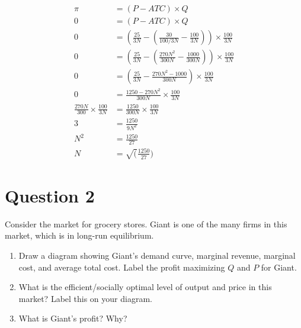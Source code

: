 \documentclass[12pt]{article}
\begin{document}
\begin{enumerate}[label = (\alph*)]
    \begin{align*}
        \pi &= (P - ATC)\times Q \\
        0 &= (P - ATC) \times Q \\
        0 &= (\frac{25}{3N} - (\frac{30}{100/3N} - \frac{100}{3N})) \times \frac{100}{3N} \\
        0 &= (\frac{25}{3N} - (\frac{270N^2}{300N} - \frac{1000}{300N})) \times \frac{100}{3N} \\
        0 &= (\frac{25}{3N} - \frac{270N^2 - 1000}{300N}) \times \frac{100}{3N} \\
        0 &= \frac{1250 - 270N^2}{300N} \times \frac{100}{3N} \\
        \frac{270N}{300} \times \frac{100}{3N} & = \frac{1250}{300N} \times \frac{100}{3N} \\
        3 &= \frac{1250}{9N^2} \\
        N^2 &= \frac{1250}{27} \\
        N &= \sqrt(\frac{1250}{27})
    \end{align*}
\end{enumerate}

\newpage
\section*{Question 2}
Consider the market for grocery stores. Giant is one of the many firms in this market, which is in long-run equilibrium.
\begin{enumerate}[label = (\alph*)]
    \item Draw a diagram showing Giant's demand curve, marginal revenue, marginal cost, and average total cost. Label the profit maximizing  $Q$ and $P$ for Giant.
    \item What is the efficient/socially optimal level of output and price in this market? Label this on your diagram.
    \item What is Giant's profit? Why?
\end{enumerate}
\vspace{4mm}
\end{document}
